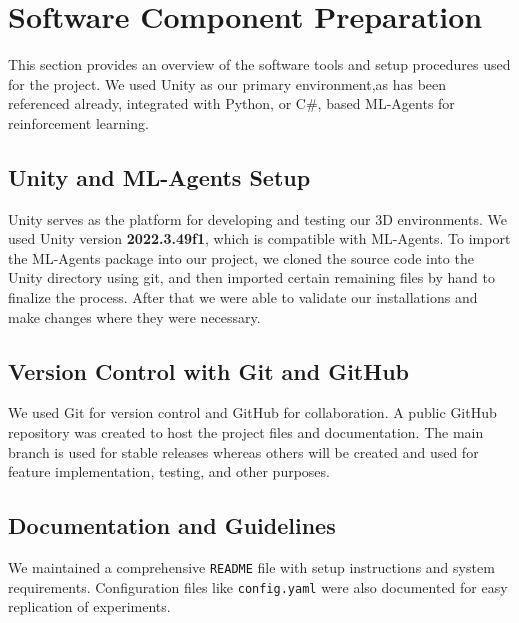 \documentclass{article}
\begin{document}
\section{Software Component Preparation}

 \hspace{2em}This section provides an overview of the software tools and setup procedures used for the project. We used Unity as our primary environment,as has been referenced already, integrated with Python, or C\#, based ML-Agents for reinforcement learning.

\subsection{Unity and ML-Agents Setup}
 \hspace{2em}Unity serves as the platform for developing and testing our 3D environments. We used Unity version \textbf{2022.3.49f1}, which is compatible with ML-Agents. To import the ML-Agents package into our project, we cloned the source code into the Unity directory using git, and then imported certain remaining files by hand to finalize the process. After that we were able to validate our installations and make changes where they were necessary.





\subsection{Version Control with Git and GitHub}
 \hspace{2em}We used Git for version control and GitHub for collaboration. A public GitHub repository was created to host the project files and documentation. The main branch is used for stable releases whereas others will be created and used for feature implementation, testing, and other purposes.



\subsection{Documentation and Guidelines}
 \hspace{2em}We maintained a comprehensive \texttt{README} file with setup instructions and system requirements. Configuration files like \texttt{config.yaml} were also documented for easy replication of experiments.
\end{document}
